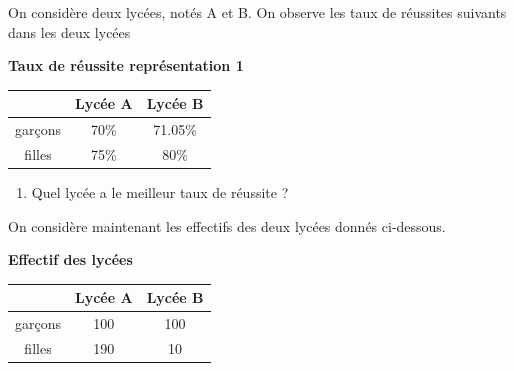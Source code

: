 \documentclass[10pt, a4paper]{article}
\begin{document}
\begin{tcolorbox}[lefttitle=2cm, colframe=gray!75!black, colback=white, title=\textbf{EXERCICE 4 : Paradoxe de Simpson}]


On considère deux lycées, notés A et B. On observe les taux de réussites suivants dans les deux lycées

\begin{minipage}{0.4\textwidth}
\textbf{Taux de réussite représentation 1}
   \centering
    
    \begin{tabular}{|c|c|c|} \hline
        &Lycée A   & Lycée B \\\hline
         garçons& 70\%& 71.05\%\\\hline
         filles &75\%& 80\%\\\hline
    \end{tabular}

\end{minipage} \hfill
\begin{minipage}{0.6\textwidth}

\begin{tcolorbox}[lefttitle=1cm, colframe=gray!75!black, colback=white, title=\textbf{EXERCICE 4.1 : représentation 1}]
\begin{enumerate}
    \item Quel lycée a le meilleur taux de réussite ?
\end{enumerate}
\vspace{1cm}

\end{tcolorbox}

\end{minipage}

\vspace{0.5cm}

\begin{tcolorbox}[lefttitle=1cm, colframe=gray!75!black, colback=white, title=\textbf{EXERCICE 4.2 : représentation 2}]
On considère maintenant les effectifs des deux lycées donnés ci-dessous. 


\begin{minipage}{0.4\textwidth}
\textbf{Effectif des lycées}
   \centering
    \begin{tabular}{|c|c|c|} \hline
        &Lycée A   & Lycée B \\\hline
         garçons &100& 100\\\hline
         filles &190& 10\\\hline
    \end{tabular}


\end{minipage}
\end{tcolorbox}
\end{tcolorbox}
\end{document}
